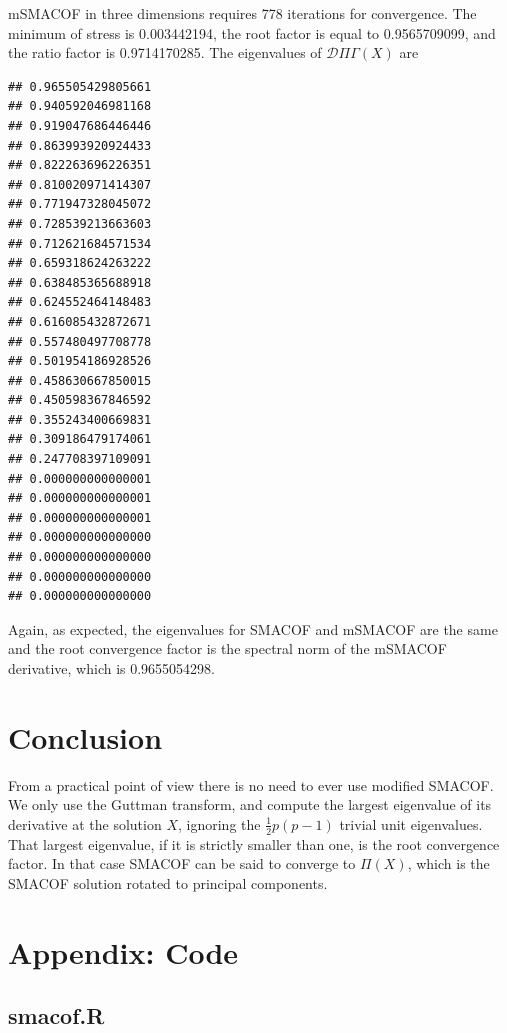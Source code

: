 \documentclass[
  12pt,
]{article}
\begin{document}
mSMACOF in three dimensions requires 778 iterations for convergence. The minimum of stress is 0.003442194,
the root factor is equal to 0.9565709099, and the ratio factor is 0.9714170285. The eigenvalues of \(\mathcal{D}\Pi\Gamma(X)\) are

\begin{verbatim}
## 0.965505429805661 
## 0.940592046981168 
## 0.919047686446446 
## 0.863993920924433 
## 0.822263696226351 
## 0.810020971414307 
## 0.771947328045072 
## 0.728539213663603 
## 0.712621684571534 
## 0.659318624263222 
## 0.638485365688918 
## 0.624552464148483 
## 0.616085432872671 
## 0.557480497708778 
## 0.501954186928526 
## 0.458630667850015 
## 0.450598367846592 
## 0.355243400669831 
## 0.309186479174061 
## 0.247708397109091 
## 0.000000000000001 
## 0.000000000000001 
## 0.000000000000001 
## 0.000000000000000 
## 0.000000000000000 
## 0.000000000000000 
## 0.000000000000000
\end{verbatim}

Again, as expected, the eigenvalues for SMACOF and mSMACOF are the same and the root convergence factor is the spectral norm of the mSMACOF derivative, which is 0.9655054298.

\section{Conclusion}\label{conclusion}

From a practical point of view there is no need to ever use modified SMACOF. We only use the Guttman transform, and compute the largest eigenvalue of its derivative at the solution \(X\), ignoring the \(\frac12 p(p-1)\) trivial unit eigenvalues. That largest eigenvalue, if it is strictly smaller than one, is the root convergence factor. In that case SMACOF can be said to converge to \(\Pi(X)\), which is the SMACOF solution rotated to principal components.

\section{Appendix: Code}\label{appendix-code}

\subsection{smacof.R}\label{smacof.r}
\end{document}
